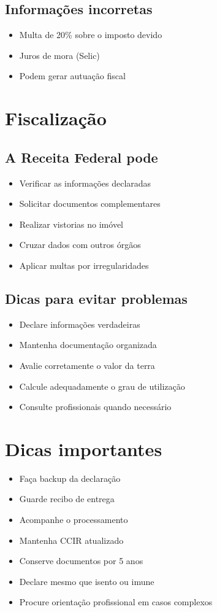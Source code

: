 \documentclass[12pt,a4paper]{article}
\begin{document}
\subsection{Informações incorretas}
\begin{itemize}
    \item Multa de 20\% sobre o imposto devido
    \item Juros de mora (Selic)
    \item Podem gerar autuação fiscal
\end{itemize}

\section{Fiscalização}

\subsection{A Receita Federal pode}
\begin{itemize}
    \item Verificar as informações declaradas
    \item Solicitar documentos complementares
    \item Realizar vistorias no imóvel
    \item Cruzar dados com outros órgãos
    \item Aplicar multas por irregularidades
\end{itemize}

\subsection{Dicas para evitar problemas}
\begin{itemize}
    \item Declare informações verdadeiras
    \item Mantenha documentação organizada
    \item Avalie corretamente o valor da terra
    \item Calcule adequadamente o grau de utilização
    \item Consulte profissionais quando necessário
\end{itemize}

\section{Dicas importantes}

\begin{itemize}
    \item Faça backup da declaração
    \item Guarde recibo de entrega
    \item Acompanhe o processamento
    \item Mantenha CCIR atualizado
    \item Conserve documentos por 5 anos
    \item Declare mesmo que isento ou imune
    \item Procure orientação profissional em casos complexos
\end{itemize}
\end{document}
